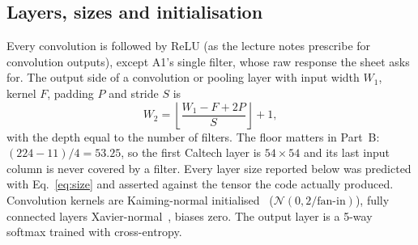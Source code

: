 \documentclass[11pt,a4paper]{article}
\begin{document}
\subsection{Layers, sizes and initialisation}
Every convolution is followed by ReLU (as the lecture notes prescribe for convolution outputs), except
A1's single filter, whose raw response the sheet asks for.  The
output side of a convolution or pooling layer with input width $W_1$, kernel $F$, padding $P$ and
stride $S$ is
\begin{equation}\label{eq:size}
W_2 = \left\lfloor \frac{W_1 - F + 2P}{S} \right\rfloor + 1 ,
\end{equation}
with the depth equal to the number of filters.  The floor matters in Part~B: $(224-11)/4 = 53.25$,
so the first Caltech layer is $54\times54$ and its last input column is never covered by a filter.
Every layer size reported below was predicted with Eq.~\eqref{eq:size} and asserted against the
tensor the code actually produced.  Convolution kernels are Kaiming-normal initialised~\cite{he}
($\mathcal N(0, 2/\text{fan-in})$), fully connected layers Xavier-normal~\cite{glorot}, biases zero.  The output
layer is a 5-way softmax trained with cross-entropy.
\end{document}
